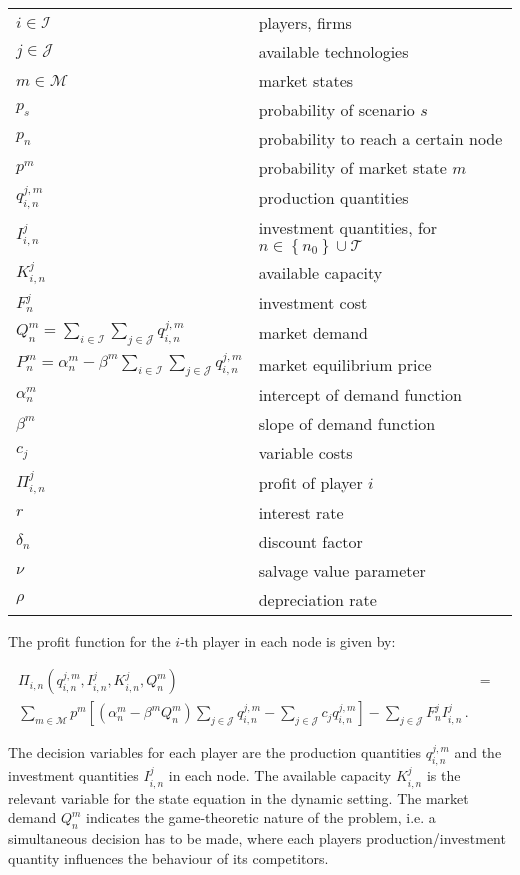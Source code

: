 \vspace{1cm}
\begin{tabular}[l]{l l}
\centering
$i \in \mathcal{I}$ & players, firms \\
$j \in \mathcal{J}$ & available technologies \\
$m\in\mathcal{M}$ & market states \\
$p_s$ & probability of scenario $s$\\
$p_n$ & probability to reach a certain node\\
$p^m$ & probability of market state $m$ \\
$ q_{i,n}^{j,m}$ & production quantities \\
$I_{i,n}^{j}$ & investment quantities, for $n\in\left\{n_0\right\}\cup\mathcal{T}$ \\
$K_{i,n}^{j}$ & available capacity\\
$F_n^{j}$ & investment cost\\
$Q_n^m = \sum_{i\in \mathcal{I}}\sum_{j\in \mathcal{J}} q_{i,n}^{j,m}$ & market demand \\
$P^m_n = \alpha_n^m-\beta^m\sum_{i\in \mathcal{I}}\sum_{j\in \mathcal{J}}q_{i,n}^{j,m}$ & market equilibrium price \\
$\alpha_n^m$ & intercept of demand function \\
$\beta^m$ & slope of demand function \\
$c_j$ & variable costs \\
$\Pi_{i,n}^j$ & profit of player $i$\\
$r$ & interest rate \\
$\delta_n$ & discount factor \\
$\nu$ & salvage value parameter\\
$\rho$ & depreciation rate\\
\end{tabular}
\vspace{1cm}

The profit function for the $i$-th player in each node is given by:

\begin{eqnarray}
\Pi_{i,n}\left(q_{i,n}^{j,m},I_{i,n}^j,K_{i,n}^j,Q_n^m\right) &=& \\ \sum_{m\in\mathcal{M}}p^m\left[\left(\alpha_n^m-\beta^m Q_n^m \right)\sum_{j\in \mathcal{J}}q_{i,n}^{j,m}-\sum_{j\in \mathcal{J}}c_jq_{i,n}^{j,m}\right]-\sum_{j\in \mathcal{J}}F_n^{j}I_{i,n}^{j}\,\nonumber.
\end{eqnarray}

The decision variables for each player are the production quantities $q_{i,n}^{j,m}$ and the investment quantities $I_{i,n}^j$ in each node. The available capacity $K_{i,n}^j$ is the relevant variable for the state equation in the dynamic setting. The market demand $Q_n^m$ indicates the game-theoretic nature of the problem, i.e. a simultaneous decision has to be made, where each players production/investment quantity influences the behaviour of its competitors.

